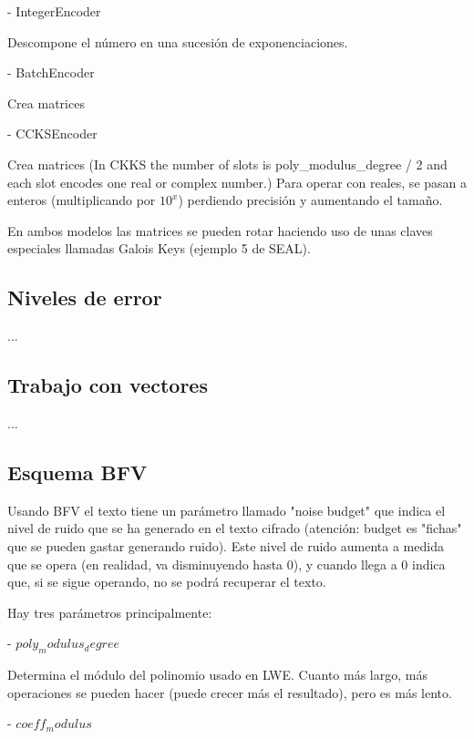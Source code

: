     - IntegerEncoder

    Descompone el número en una sucesión de exponenciaciones.

    - BatchEncoder

    Crea matrices

    - CCKSEncoder

    Crea matrices (In CKKS the number of slots is poly\_modulus\_degree / 2 and each slot encodes one real or complex number.) Para operar con reales, se pasan a enteros (multiplicando por $10^x$) perdiendo precisión y aumentando el tamaño.


    En ambos modelos las matrices se pueden rotar haciendo uso de unas claves especiales llamadas Galois Keys (ejemplo 5 de SEAL).

\subsection{Niveles de error}

...

\subsection{Trabajo con vectores}

...

\subsection{Esquema BFV}

Usando BFV el texto tiene un parámetro llamado "noise budget" que indica el nivel de ruido que se ha generado en el texto cifrado (atención: budget es "fichas" que se pueden gastar generando ruido). Este nivel de ruido aumenta a medida que se opera (en realidad, va disminuyendo hasta 0), y cuando llega a 0 indica que, si se sigue operando, no se podrá recuperar el texto.


Hay tres parámetros principalmente:

- $poly_modulus_degree$

Determina el módulo del polinomio usado en LWE. Cuanto más largo, más operaciones se pueden hacer (puede crecer más el resultado), pero es más lento.

- $coeff_modulus$

